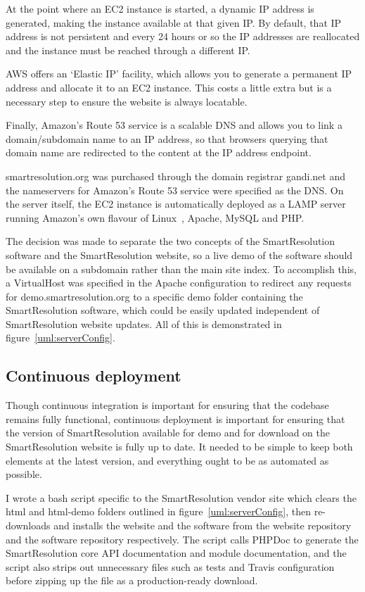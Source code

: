 At the point where an EC2 instance is started, a dynamic IP address is generated, making the instance available at that given IP. By default, that IP address is not persistent and every 24 hours or so the IP addresses are reallocated and the instance must be reached through a different IP.

AWS offers an `Elastic IP' facility, which allows you to generate a permanent IP address and allocate it to an EC2 instance. This costs a little extra but is a necessary step to ensure the website is always locatable.

Finally, Amazon's Route 53 service is a scalable DNS and allows you to link a domain/subdomain name to an IP address, so that browsers querying that domain name are redirected to the content at the IP address endpoint.

smartresolution.org was purchased through the domain registrar gandi.net and the nameservers for Amazon's Route 53 service were specified as the DNS. On the server itself, the EC2 instance is automatically deployed as a LAMP server running Amazon's own flavour of Linux~\cite{aws:linux}, Apache, MySQL and PHP.

The decision was made to separate the two concepts of the SmartResolution software and the SmartResolution website, so a live demo of the software should be available on a subdomain rather than the main site index. To accomplish this, a VirtualHost was specified in the Apache configuration to redirect any requests for demo.smartresolution.org to a specific demo folder containing the SmartResolution software, which could be easily updated independent of SmartResolution website updates. All of this is demonstrated in figure~\ref{uml:serverConfig}.

\subsection{Continuous deployment}

Though continuous integration is important for ensuring that the codebase remains fully functional, continuous deployment is important for ensuring that the version of SmartResolution available for demo and for download on the SmartResolution website is fully up to date. It needed to be simple to keep both elements at the latest version, and everything ought to be as automated as possible.

I wrote a bash script specific to the SmartResolution vendor site which clears the html and html-demo folders outlined in figure~\ref{uml:serverConfig}, then re-downloads and installs the website and the software from the website repository and the software repository respectively. The script calls PHPDoc to generate the SmartResolution core API documentation and module documentation, and the script also strips out unnecessary files such as tests and Travis configuration before zipping up the file as a production-ready download.

